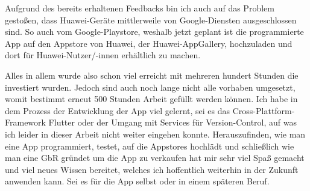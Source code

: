 Aufgrund des bereits erhaltenen Feedbacks bin ich auch auf das Problem gestoßen, dass Huawei-Geräte mittlerweile von Google-Diensten ausgeschlossen sind.
So auch vom Google-Playstore, weshalb jetzt geplant ist die programmierte App auf den Appstore von Huawei, der Huawei-AppGallery, hochzuladen und dort
für Huawei-Nutzer/-innen erhältlich zu machen.

Alles in allem wurde also schon viel erreicht mit mehreren hundert Stunden die investiert wurden. Jedoch sind auch noch lange nicht alle vorhaben 
umgesetzt, womit bestimmt erneut 500 Stunden Arbeit gefüllt werden können. Ich habe in dem Prozess der Entwicklung der App viel gelernt, sei es 
das Cross-Plattform-Framework Flutter oder der Umgang mit Services für Version-Control, auf was ich leider in dieser Arbeit nicht weiter eingehen konnte.
Herauszufinden, wie man eine App programmiert, testet, auf die Appstores hochlädt und schließlich wie man eine GbR gründet um die App zu verkaufen
hat mir sehr viel Spaß gemacht und viel neues Wissen bereitet, welches ich hoffentlich weiterhin in der Zukunft anwenden kann. Sei es für die 
App selbst oder in einem späteren Beruf.